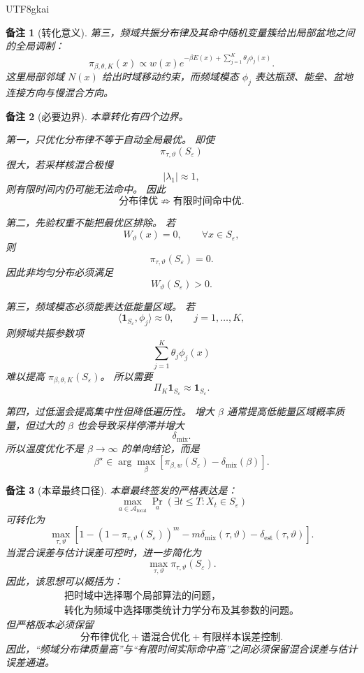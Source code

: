 \documentclass[12pt]{article}
\newtheorem{remark}{备注}[section]
\begin{document}
\begin{CJK*}{UTF8}{gkai}
\begin{remark}[转化意义]
第三，频域共振分布律及其命中随机变量簇给出局部盆地之间的全局调制：
\[
  \pi_{\beta,\theta,K}(x)
  \propto
  w(x)e^{-\beta E(x)+\sum_{j=1}^{K}\theta_j\phi_j(x)}.
\]
这里局部邻域 \(N(x)\) 给出时域移动约束，而频域模态 \(\phi_j\) 表达瓶颈、能垒、盆地连接方向与慢混合方向。
\end{remark}

\begin{remark}[必要边界]
本章转化有四个边界。

第一，只优化分布律不等于自动全局最优。
即使
\[
  \pi_{\tau,\vartheta}(S_\varepsilon)
\]
很大，若采样核混合极慢
\[
  |\lambda_1|\approx1,
\]
则有限时间内仍可能无法命中。
因此
\[
  \text{分布律优}
  \not\Rightarrow
  \text{有限时间命中优}.
\]

第二，先验权重不能把最优区排除。
若
\[
  W_\vartheta(x)=0,
  \qquad
  \forall x\in S_\varepsilon,
\]
则
\[
  \pi_{\tau,\vartheta}(S_\varepsilon)=0.
\]
因此非均匀分布必须满足
\[
  W_\vartheta(S_\varepsilon)>0.
\]

第三，频域模态必须能表达低能量区域。
若
\[
  \langle\mathbf 1_{S_\varepsilon},\phi_j\rangle\approx0,
  \qquad
  j=1,\ldots,K,
\]
则频域共振参数项
\[
  \sum_{j=1}^{K}\theta_j\phi_j(x)
\]
难以提高 \(\pi_{\beta,\theta,K}(S_\varepsilon)\)。
所以需要
\[
  \Pi_K\mathbf 1_{S_\varepsilon}\approx\mathbf 1_{S_\varepsilon}.
\]

第四，过低温会提高集中性但降低遍历性。
增大 \(\beta\) 通常提高低能量区域概率质量，但过大的 \(\beta\) 也会导致采样停滞并增大
\[
  \delta_{\mathrm{mix}}.
\]
所以温度优化不是 \(\beta\to\infty\) 的单向结论，而是
\[
  \boxed{
  \beta^\star
  \in
  \arg\max_{\beta}
  \left[
  \pi_{\beta,w}(S_\varepsilon)-\delta_{\mathrm{mix}}(\beta)
  \right].
  }
\]
\end{remark}

\begin{remark}[本章最终口径]
本章最终签发的严格表达是：
\[
  \boxed{
  \max_{a\in\mathcal A_{\mathrm{local}}}
  \Pr_a(\exists t\le T:X_t\in S_\varepsilon)
  }
\]
可转化为
\[
  \boxed{
  \max_{\tau,\vartheta}
  \left[
  1-
  \left(
  1-\pi_{\tau,\vartheta}(S_\varepsilon)
  \right)^m
  -
  m\delta_{\mathrm{mix}}(\tau,\vartheta)
  -
  \delta_{\mathrm{est}}(\tau,\vartheta)
  \right].
  }
\]
当混合误差与估计误差可控时，进一步简化为
\[
  \boxed{
  \max_{\tau,\vartheta}
  \pi_{\tau,\vartheta}(S_\varepsilon).
  }
\]
因此，该思想可以概括为：
\[
  \boxed{
  \begin{gathered}
  \text{把时域中选择哪个局部算法的问题，}\\
  \text{转化为频域中选择哪类统计力学分布及其参数的问题。}
  \end{gathered}
  }
\]
但严格版本必须保留
\[
  \boxed{
  \text{分布律优化}
  +
  \text{谱混合优化}
  +
  \text{有限样本误差控制}.
  }
\]
因此，“频域分布律质量高”与“有限时间实际命中高”之间必须保留混合误差与估计误差通道。
\end{remark}


\end{CJK*}
\end{document}
